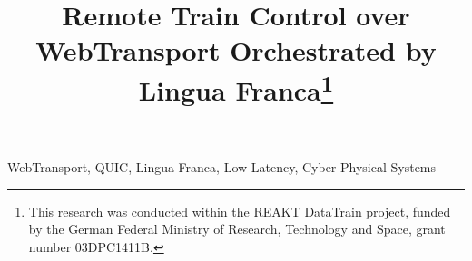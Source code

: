 \documentclass[10pt,journal,cspaper]{IEEEtran}
\begin{document}

\title{Remote Train Control over WebTransport \break Orchestrated by Lingua Franca\thanks{This research was conducted within the REAKT DataTrain project, funded by the German Federal Ministry of Research, Technology and Space, grant number 03DPC1411B.}}

\author{%

}


\maketitle




\begin{IEEEkeywords}
  WebTransport, QUIC, Lingua Franca, Low Latency, Cyber-Physical Systems
\end{IEEEkeywords}










\end{document}
